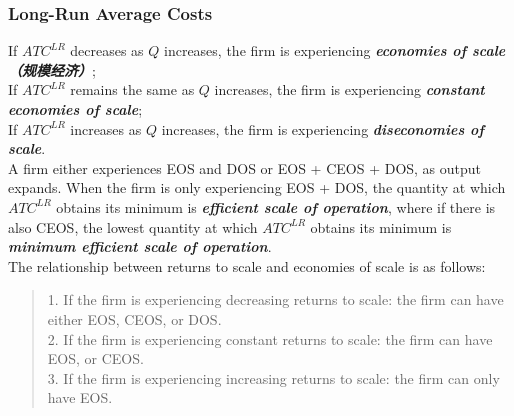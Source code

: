 \subsubsection{Long-Run Average Costs}
If $ATC^{LR}$ decreases as $Q$ increases, the firm is experiencing \textbf{\textit{economies of scale（规模经济）}}; \\
If $ATC^{LR}$ remains the same as $Q$ increases, the firm is experiencing \textbf{\textit{constant economies of scale}}; \\
If $ATC^{LR}$ increases as $Q$ increases, the firm is experiencing \textbf{\textit{diseconomies of scale}}. \\
A firm either experiences EOS and DOS or EOS + CEOS + DOS, as output expands. When the firm is only experiencing EOS + DOS, the quantity at which $ATC^{LR}$ obtains its minimum is \textbf{\textit{efficient scale of operation}}, where if there is also CEOS, the lowest quantity at which $ATC^{LR}$ obtains its minimum is \textbf{\textit{minimum efficient scale of operation}}. \\
The relationship between returns to scale and economies of scale is as follows:
\begin{quote}
    1. If the firm is experiencing decreasing returns to scale: the firm can have either EOS, CEOS, or DOS. \\
    2. If the firm is experiencing constant returns to scale: the firm can have EOS, or CEOS. \\
    3. If the firm is experiencing increasing returns to scale: the firm can only have EOS.
\end{quote}

\newpage